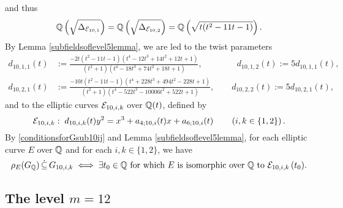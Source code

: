 and thus 
\[
\mathbb{Q}\left( \sqrt{\Delta_{\mathcal{E}_{10,1}}} \right) = \mathbb{Q}\left( \sqrt{\Delta_{\mathcal{E}_{10,2}}} \right) = \mathbb{Q} \left( \sqrt{t(t^2 - 11t - 1)} \right).
\]
By Lemma \ref{subfieldsoflevel5lemma}, we are led to the twist parameters
\[
\begin{split}
d_{10,1,1}(t) &:= \frac{-2t(t^2-11t-1)(t^4 - 12t^3 + 14t^2 + 12t + 1)}{(t^2 + 1)(t^4 - 18t^3 + 74t^2 + 18t + 1)}, \quad\quad\quad\quad d_{10,1,2}(t) := 5 d_{10,1,1}(t), \\
d_{10,2,1}(t) &:= \frac{-10t(t^2-11t-1)(t^4 + 228t^3 + 494t^2 - 228t + 1)}{(t^2 + 1) (t^4 - 522t^3 - 10006t^2 + 522t + 1)}, \quad\quad d_{10,2,2}(t) := 5 d_{10,2,1}(t),
\end{split}
\]
and to the elliptic curves $\mathcal{E}_{10,i,k}$ over $\mathbb{Q}(t)$, defined by
\[
\mathcal{E}_{10,i,k} : \; d_{10,i,k}(t) y^2 = x^3 + a_{4;10,i}(t) x + a_{6; 10,i}(t) \quad\quad \left( i, k \in \{ 1, 2 \} \right).
\]
By \eqref{conditionsforGsub10ij} and Lemma \ref{subfieldsoflevel5lemma}, for each elliptic curve $E$ over $\mathbb{Q}$ and for each $i, k \in \{1, 2 \}$, we have
\[
\rho_{E}(G_{\mathbb{Q}}) \, \dot\subseteq \, G_{10,i,k} \; \Longleftrightarrow \; \exists t_0 \in \mathbb{Q} \text{ for which $E$ is isomorphic over $\mathbb{Q}$ to $\mathcal{E}_{10,i,k}\left( t_0 \right)$.}
\]

\medskip

\subsection{The level \texorpdfstring{$m = 12$}.}

